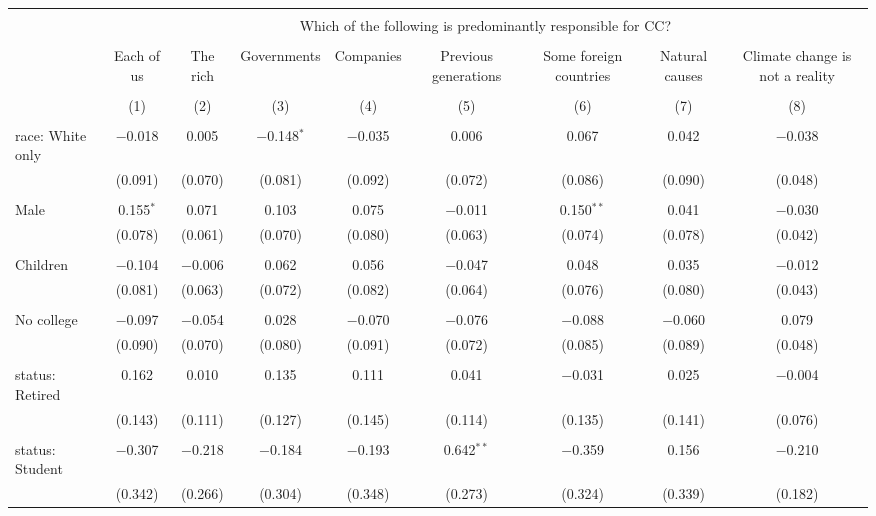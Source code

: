 
\begin{tabular}{@{\extracolsep{5pt}}lcccccccc} 
\\[-1.8ex]\hline 
\hline \\[-1.8ex] 
 & \multicolumn{8}{c}{Which of the following is predominantly responsible for CC?} \\ 
\cline{2-9} 
\\[-1.8ex] & Each of us & The rich & Governments & Companies & Previous generations & Some foreign countries & Natural causes & Climate change is not a reality \\ 
\\[-1.8ex] & (1) & (2) & (3) & (4) & (5) & (6) & (7) & (8)\\ 
\hline \\[-1.8ex] 
 race: White only & $-$0.018 & 0.005 & $-$0.148$^{*}$ & $-$0.035 & 0.006 & 0.067 & 0.042 & $-$0.038 \\ 
  & (0.091) & (0.070) & (0.081) & (0.092) & (0.072) & (0.086) & (0.090) & (0.048) \\ 
  & & & & & & & & \\ 
 Male & 0.155$^{*}$ & 0.071 & 0.103 & 0.075 & $-$0.011 & 0.150$^{**}$ & 0.041 & $-$0.030 \\ 
  & (0.078) & (0.061) & (0.070) & (0.080) & (0.063) & (0.074) & (0.078) & (0.042) \\ 
  & & & & & & & & \\ 
 Children & $-$0.104 & $-$0.006 & 0.062 & 0.056 & $-$0.047 & 0.048 & 0.035 & $-$0.012 \\ 
  & (0.081) & (0.063) & (0.072) & (0.082) & (0.064) & (0.076) & (0.080) & (0.043) \\ 
  & & & & & & & & \\ 
 No college & $-$0.097 & $-$0.054 & 0.028 & $-$0.070 & $-$0.076 & $-$0.088 & $-$0.060 & 0.079 \\ 
  & (0.090) & (0.070) & (0.080) & (0.091) & (0.072) & (0.085) & (0.089) & (0.048) \\ 
  & & & & & & & & \\ 
 status: Retired & 0.162 & 0.010 & 0.135 & 0.111 & 0.041 & $-$0.031 & 0.025 & $-$0.004 \\ 
  & (0.143) & (0.111) & (0.127) & (0.145) & (0.114) & (0.135) & (0.141) & (0.076) \\ 
  & & & & & & & & \\ 
 status: Student & $-$0.307 & $-$0.218 & $-$0.184 & $-$0.193 & 0.642$^{**}$ & $-$0.359 & 0.156 & $-$0.210 \\ 
  & (0.342) & (0.266) & (0.304) & (0.348) & (0.273) & (0.324) & (0.339) & (0.182) \\ 

\end{tabular}
